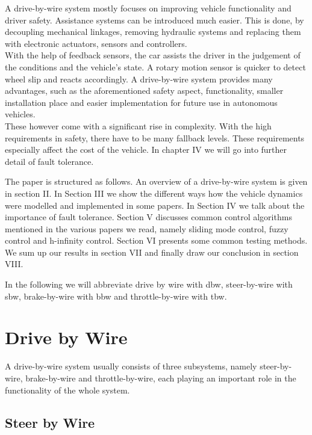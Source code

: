 \documentclass[conference]{IEEEtran}
\begin{document}
A drive-by-wire system mostly focuses on improving vehicle functionality and driver safety. Assistance systems can be introduced much easier. This is done, by decoupling mechanical linkages, removing hydraulic systems and replacing them with electronic actuators, sensors and controllers.
\\ With the help of feedback sensors, the car assists the driver in the judgement of the conditions and the vehicle's state. A rotary motion sensor is quicker to detect wheel slip and reacts accordingly. A drive-by-wire system provides many advantages, such as the aforementioned safety aspect, functionality, smaller installation place and easier implementation for future use in autonomous vehicles.
\\These however come with a significant rise in complexity. With the high requirements in safety, there have to be many fallback levels. These requirements especially affect the cost of the vehicle. In chapter IV we will go into further detail of fault tolerance.

The paper is structured as follows. An overview of a drive-by-wire system is given in section II. In Section III we show the different ways how the vehicle dynamics were modelled and implemented in some papers.
In Section IV we talk about the importance of fault tolerance.
Section V discusses common control algorithms mentioned in the various papers we read, namely sliding mode control, fuzzy control and h-infinity control. 
Section VI presents some common testing methods.
We sum up our results in section VII and finally draw our conclusion in section VIII.

In the following we will abbreviate drive by wire with dbw, steer-by-wire with sbw, brake-by-wire with bbw and throttle-by-wire with tbw.

\section{Drive by Wire}

A drive-by-wire system usually consists of three subsystems, namely steer-by-wire, brake-by-wire and throttle-by-wire, each playing an important role in the functionality of the whole system.

\subsection{Steer by Wire}
\end{document}
